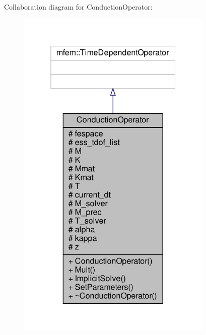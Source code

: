 Collaboration diagram for Conduction\+Operator\+:\nopagebreak
\begin{figure}[H]
\begin{center}
\leavevmode
\includegraphics[width=265pt]{classConductionOperator__coll__graph}
\end{center}
\end{figure}
